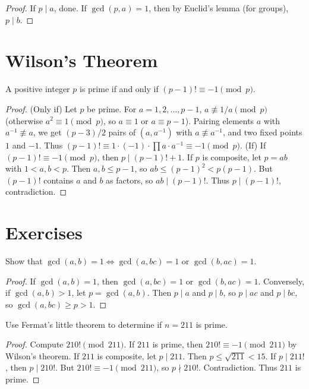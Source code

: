 \begin{proof}
If $p \mid a$, done. If $\gcd(p, a) = 1$, then by Euclid's lemma (for groups), $p \mid b$.
\end{proof}

\section{Wilson's Theorem}
\label{sec:wilson}

\begin{theorem}
\label{thm:wilson}
A positive integer $p$ is prime if and only if $(p-1)! \equiv -1 \pmod p$.
\end{theorem}

\begin{proof}
(Only if) Let $p$ be prime. For $a = 1, 2, \ldots, p-1$, $a \not\equiv 1/a \pmod p$ (otherwise $a^2 \equiv 1 \pmod p$, so $a \equiv 1$ or $a \equiv p-1$). Pairing elements $a$ with $a^{-1} \not\equiv a$, we get $(p-3)/2$ pairs of $(a, a^{-1})$ with $a \not\equiv a^{-1}$, and two fixed points $1$ and $-1$. Thus $(p-1)! \equiv 1 \cdot (-1) \cdot \prod a \cdot a^{-1} \equiv -1 \pmod p$.
(If) If $(p-1)! \equiv -1 \pmod p$, then $p \mid (p-1)! + 1$. If $p$ is composite, let $p = ab$ with $1 < a, b < p$. Then $a, b \leq p-1$, so $ab \leq (p-1)^2 < p(p-1)$. But $(p-1)!$ contains $a$ and $b$ as factors, so $ab \mid (p-1)!$. Thus $p \mid (p-1)!$, contradiction.
\end{proof}

\section{Exercises}
\label{sec:number-theory-exercises}

\begin{exercise}
\label{ex:gcd-coprime}
Show that $\gcd(a, b) = 1 \iff \gcd(a, bc) = 1 \text{ or } \gcd(b, ac) = 1$.
\begin{proof}
If $\gcd(a, b) = 1$, then $\gcd(a, bc) = 1$ or $\gcd(b, ac) = 1$. Conversely, if $\gcd(a, b) > 1$, let $p = \gcd(a, b)$. Then $p \mid a$ and $p \mid b$, so $p \mid ac$ and $p \mid bc$, so $\gcd(a, bc) \geq p > 1$.
\end{proof}
\end{exercise}

\begin{exercise}
\label{ex:congruence-primality}
Use Fermat's little theorem to determine if $n = 211$ is prime.
\begin{proof}
Compute $210! \pmod{211}$. If $211$ is prime, then $210! \equiv -1 \pmod{211}$ by Wilson's theorem. If $211$ is composite, let $p \mid 211$. Then $p \leq \sqrt{211} < 15$. If $p \mid 211!$, then $p \mid 210!$. But $210! \equiv -1 \pmod{211}$, so $p \nmid 210!$. Contradiction. Thus $211$ is prime.
\end{proof}
\end{exercise}
